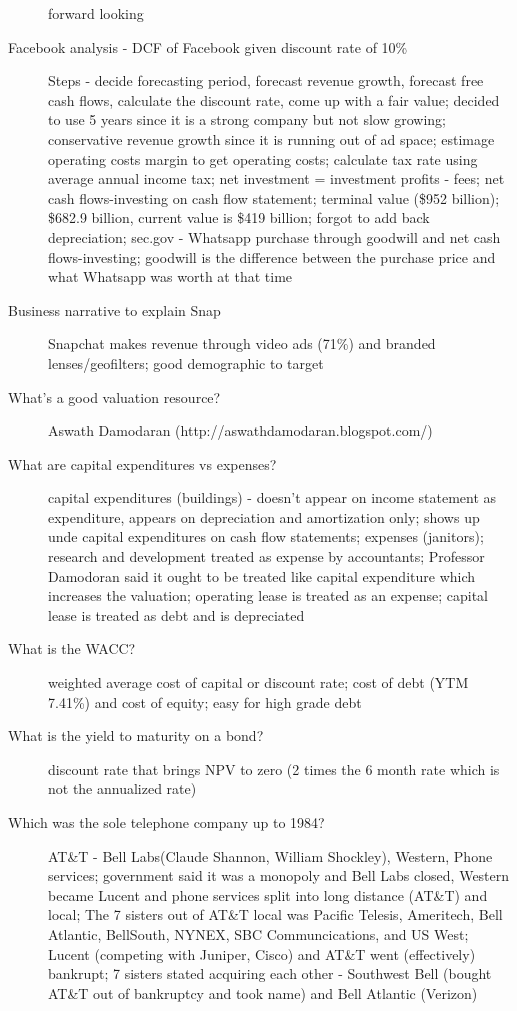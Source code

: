 \documentclass[11pt]{article}
\begin{document}
\begin{description}
  forward looking
\item[Facebook analysis - DCF of Facebook given discount rate of 10\%]
  Steps - decide forecasting period, forecast revenue growth, forecast free cash flows, calculate the discount rate, come up with a fair value;
  decided to use 5 years since it is a strong company but not slow growing;
  conservative revenue growth since it is running out of ad space;
  estimage operating costs margin to get operating costs;
  calculate tax rate using average annual income tax;
  net investment = investment profits - fees;
  net cash flows-investing on cash flow statement;
  terminal value (\$952 billion);
  \$682.9 billion, current value is \$419 billion;
  forgot to add back depreciation;
  sec.gov - Whatsapp purchase through goodwill and net cash flows-investing;
  goodwill is the difference between the purchase price and what Whatsapp was worth at that time
\item[Business narrative to explain Snap]
  Snapchat makes revenue through video ads (71\%) and branded lenses/geofilters;
  good demographic to target
\item[What's a good valuation resource?]
  Aswath Damodaran (http://aswathdamodaran.blogspot.com/)
\item[What are capital expenditures vs expenses?]
  capital expenditures (buildings) - doesn't appear on income statement as expenditure, appears on depreciation and amortization only; shows up unde capital expenditures on cash flow statements;
  expenses (janitors);
  research and development treated as expense by accountants;
  Professor Damodoran said it ought to be treated like capital expenditure which increases the valuation;
  operating lease is treated as an expense;
  capital lease is treated as debt and is depreciated
\item[What is the WACC?]
  weighted average cost of capital or discount rate;
  cost of debt (YTM 7.41\%) and cost of equity;
  easy for high grade debt
\item[What is the yield to maturity on a bond?]
  discount rate that brings NPV to zero (2 times the 6 month rate which is not the annualized rate)
\item[Which was the sole telephone company up to 1984?]
  AT\&T - Bell Labs(Claude Shannon, William Shockley), Western, Phone services;
  government said it was a monopoly and Bell Labs closed, Western became Lucent and phone services split into long distance (AT\&T) and local;
  The 7 sisters out of AT\&T local was Pacific Telesis, Ameritech, Bell Atlantic, BellSouth, NYNEX, SBC Communcications, and US West;
  Lucent (competing with Juniper, Cisco) and AT\&T went (effectively) bankrupt;
  7 sisters stated acquiring each other - Southwest Bell (bought AT\&T out of bankruptcy and took name) and Bell Atlantic (Verizon)
\end{description}
\end{document}
